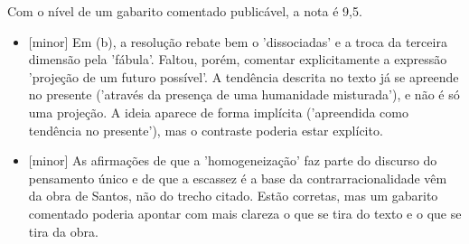 \documentclass{article}%
\begin{document}
\newline%
Com o nível de um gabarito comentado publicável, a nota é 9,5.%
\begin{itemize}%
\item%
{[}minor{]} Em (b), a resolução rebate bem o 'dissociadas' e a troca da terceira dimensão pela 'fábula'. Faltou, porém, comentar explicitamente a expressão 'projeção de um futuro possível'. A tendência descrita no texto já se apreende no presente ('através da presença de uma humanidade misturada'), e não é só uma projeção. A ideia aparece de forma implícita ('apreendida como tendência no presente'), mas o contraste poderia estar explícito.%
\item%
{[}minor{]} As afirmações de que a 'homogeneização' faz parte do discurso do pensamento único e de que a escassez é a base da contrarracionalidade vêm da obra de Santos, não do trecho citado. Estão corretas, mas um gabarito comentado poderia apontar com mais clareza o que se tira do texto e o que se tira da obra.%
\end{itemize}%
\end{document}
